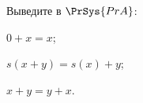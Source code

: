 Выведите в $\PrSys{PrA}$:
\begin{enumcyr}
    \item $0 + x = x$;
    \item $s(x + y) = s(x) + y$;
    \item $x + y = y + x$.
\end{enumcyr}